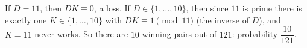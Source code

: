 If $D=11$, then $DK\equiv0$, a loss. If $D\in\{1,\dots,10\}$, then since $11$ is prime there is exactly one $K\in\{1,\dots,10\}$ with $DK\equiv1\pmod{11}$ (the inverse of $D$), and $K=11$ never works. So there are $10$ winning pairs out of $121$: probability $\boxed{\dfrac{10}{121}}$.

